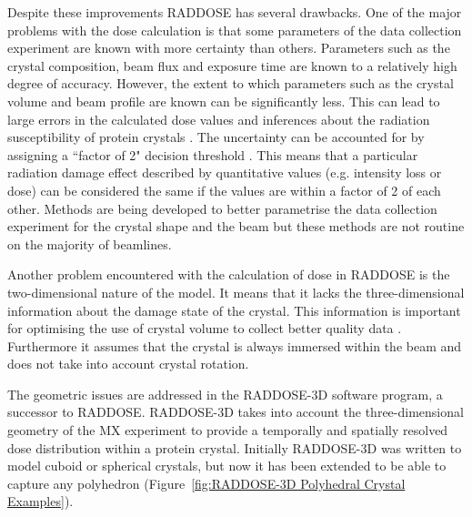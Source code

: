         Despite these improvements RADDOSE has several drawbacks. One of the major problems with the dose calculation is that some parameters of the data collection experiment are known with more certainty than others.
        Parameters such as the crystal composition, beam flux and exposure time are known to a relatively high degree of accuracy.
        However, the extent to which parameters such as the crystal volume \cite{holton2009} and beam profile \cite{krojer2011} are known can be significantly less.
        This can lead to large errors in the calculated dose values and inferences about the radiation susceptibility of protein crystals \cite{krojer2011}.
        The uncertainty can be accounted for by assigning a ``factor of 2" decision threshold \cite{holton2009}.
		This means that a particular radiation damage effect described by quantitative values (e.g. intensity loss or dose) can be considered the same if the values are within a factor of 2 of each other.
        Methods are being developed to better parametrise the data collection experiment for the crystal shape \cite{svensson2015fully,khan2012confocal,brockhauser2008x} and the beam \cite{bowler2015massif} but these methods are not routine on the majority of beamlines.

        Another problem encountered with the calculation of dose in RADDOSE is the two-dimensional nature of the model. It means that it lacks the three-dimensional information about the damage state of the crystal.
        This information is important for optimising the use of crystal volume to collect better quality data \cite{zeldin2012,zeldin2013dwd}.
        Furthermore it assumes that the crystal is always immersed within the beam and does not take into account crystal rotation.

        The geometric issues are addressed in the RADDOSE-3D \cite{zeldin2013} software program, a successor to RADDOSE.
        RADDOSE-3D takes into account the three-dimensional geometry of the MX experiment to provide a temporally and spatially resolved dose distribution within a protein crystal.
        Initially RADDOSE-3D was written to model cuboid or spherical crystals, but now it has been extended to be able to capture any polyhedron (Figure~\ref{fig:RADDOSE-3D Polyhedral Crystal Examples}).

